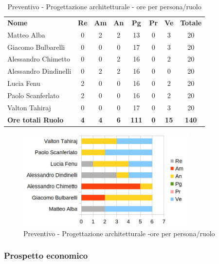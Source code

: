 \begin{table} [h!]
	\begin{center}
		\begin{tabular} { m{3.5cm} c c c c c c c }
			\rowcolor{lightgray}
			\textbf{Nome} & \textbf{Re} & \textbf{Am} & \textbf{An} & \textbf{Pg} & \textbf{Pr} & \textbf{Ve} & \textbf{Totale} \\
			Matteo Alba & 0 & 2 & 2 & 13 & 0 & 3 & 20 \\
			Giacomo Bulbarelli & 0 & 0 & 0 & 17 & 0 & 3 & 20 \\
			Alessandro Chimetto & 0 & 0 & 2 & 16 & 0 & 2 & 20 \\
			Alessandro Dindinelli & 0 & 2 & 2 & 16 & 0 & 0 & 20 \\
			Lucia Fenu & 2 & 0 & 0 & 16 & 0 & 2 & 20 \\
			Paolo Scanferlato & 2 & 0 & 0 & 16 & 0 & 2 & 20 \\
			Valton Tahiraj & 0 & 0 & 0 & 17 & 0 & 3 & 20 \\
			\textbf{Ore totali Ruolo} & \textbf{4} & \textbf{4} & \textbf{6} & \textbf{111} & \textbf{0}& \textbf{15} & \textbf{140}
		\end{tabular}
		\caption{Preventivo - Progettazione architetturale - ore per persona/ruolo}
	\end{center}
\end{table}

\begin{figure} [h!]
	\centering
	\includegraphics[width=0.8\textwidth]{res/img/grafici/consolidamento_dei_requisiti_ore_ruolo.jpg}
	\caption{Preventivo - Progettazione architetturale -ore per persona/ruolo} 
\end{figure}

\newpage

\subsubsection{Prospetto economico}

